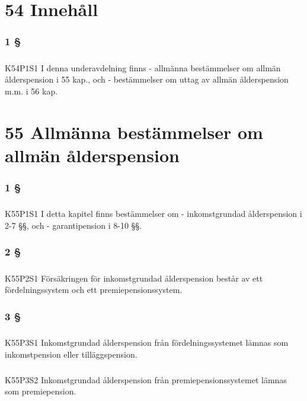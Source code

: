 \documentclass[a4paper,notitlepage,openany,10pt]{book}
\begin{document}
\chapter*{54 Innehåll}
\subsection*{1 §}
\paragraph*{}
{\tiny K54P1S1}
I denna underavdelning finns
\newline - allmänna bestämmelser om allmän ålderspension i 55 kap., och
\newline - bestämmelser om uttag av allmän ålderspension m.m. i 56 kap.
\chapter*{55 Allmänna bestämmelser om allmän ålderspension}
\subsection*{1 §}
\paragraph*{}
{\tiny K55P1S1}
I detta kapitel finns bestämmelser om
\newline - inkomstgrundad ålderspension i 2-7 §§, och
\newline - garantipension i 8-10 §§.
\subsection*{2 §}
\paragraph*{}
{\tiny K55P2S1}
Försäkringen för inkomstgrundad ålderspension består av ett fördelningssystem och ett premiepensionssystem.
\subsection*{3 §}
\paragraph*{}
{\tiny K55P3S1}
Inkomstgrundad ålderspension från fördelningssystemet lämnas som inkomstpension eller tilläggspension.
\paragraph*{}
{\tiny K55P3S2}
Inkomstgrundad ålderspension från premiepensionssystemet lämnas som premiepension.
\end{document}
